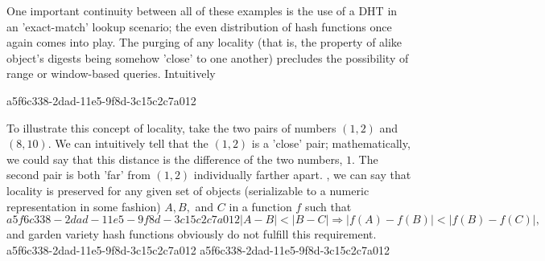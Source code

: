 \documentclass[12pt]{article}
\begin{document}
\par One important continuity between all of these examples is the use of a DHT in an 'exact-match' lookup scenario; the even distribution of hash functions once again comes into play. The purging of any locality (that is, the property of alike object's digests being somehow 'close' to one another) precludes the possibility of range or window-based queries. Intuitively

a5f6c338-2dad-11e5-9f8d-3c15c2c7a012\par To illustrate this concept of locality, take the two pairs of numbers $(1,2)$ and $(8,10)$. We can intuitively tell that the $(1,2)$ is a 'close' pair; mathematically, we could say that this distance is the difference of the two numbers, $1$. The second pair is both 'far' from $(1,2)$ individually farther apart. , we can say that locality is preserved for any given set of objects (serializable to a numeric representation in some fashion) $A,B,$ and $C$ in a function $f$ such that
\begin{equation}
a5f6c338-2dad-11e5-9f8d-3c15c2c7a012|A-B| < |B-C| \Rightarrow |f(A)-f(B)| < |f(B) - f(C)|,
\end{equation}
and garden variety hash functions obviously do not fulfill this requirement.
a5f6c338-2dad-11e5-9f8d-3c15c2c7a012
\printbibliography
a5f6c338-2dad-11e5-9f8d-3c15c2c7a012
\end{document}

